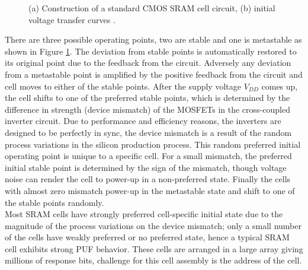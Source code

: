 \begin{figure}
\centering
{}
\caption{(a) Construction of a standard CMOS SRAM cell circuit, (b) initial voltage transfer curves  \cite{17}.}
\label{img:sram}
\end{figure}

There are three possible operating points, two are stable and one is metastable as shown in Figure \ref{img:sram}. The deviation from stable points is automatically restored to its original point due to the feedback from the circuit. Adversely any deviation from a metastable point is amplified by the positive feedback from the circuit and cell moves to either of the stable points. After the supply voltage $V_{DD}$ comes up, the cell shifts to one of the preferred stable points, which is determined by the difference in
strength (device mismatch) of the MOSFETs in the cross-coupled inverter circuit. Due to performance and efficiency reasons, the inverters are designed to be perfectly in sync, the device mismatch is a result of the random process variations in the silicon production process. This random preferred initial operating point is unique to a specific cell. For a small mismatch, the preferred initial stable point is determined by the sign of the mismatch, though voltage noise can render the cell to
power-up in a non-preferred state. Finally the cells with almost zero mismatch power-up in the metastable state and shift to one of the stable points randomly.\\

Most SRAM cells have strongly preferred cell-specific initial state due to the magnitude of the process variations on the device mismatch; only a small number of the cells have weakly preferred or no preferred state, hence a typical SRAM cell exhibits strong PUF behavior. These cells are arranged in a large array giving millions of response bits, challenge for this cell assembly is the address of the cell.\\

